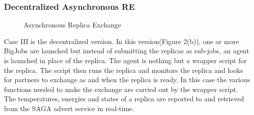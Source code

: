 \documentclass[a4paper,10pt]{article}
\begin{document}
\subsubsection{Decentralized Asynchronous RE}

\begin{figure}
\centering


\caption{\small Asynchronous Replica Exchange}
\label{fig:decentralized}
\end{figure}

Case III is the decentralized version. In this version(Figure 2(b)), one or more BigJobs are launched but instead of submitting the replicas as sub-jobs, an agent is launched in place of the replica. The agent is nothing but a wrapper script for the replica. The script then runs the replica and monitors the replica and looks for partners to exchange as and when the replica is ready. In this case the various functions needed to make the exchange are carried out by the wrapper script. The temperatures, energies and states of a replica are reported to and retrieved from the SAGA advert service in real-time.
\end{document}
